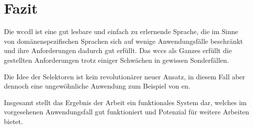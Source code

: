 \section{Fazit}
    Die \gls{wccdl} ist eine gut lesbare und einfach zu erlernende Sprache,
    die im Sinne von domänenspezifischen Sprachen
    sich auf wenige Anwendungsfälle beschränkt
    und ihre Anforderungen dadurch gut erfüllt.
    Das \gls{wccs} als Ganzes erfüllt die gestellten Anforderungen
    trotz einiger Schwächen in gewissen Sonderfällen.

    Die Idee der Selektoren ist kein revolutionärer neuer Ansatz,
    in diesem Fall aber dennoch eine ungewöhnliche Anwendung
    zum Beispiel von {\cssSelector}en.

    Insgesamt stellt das Ergebnis der Arbeit ein funktionales System dar,
    welches im vorgesehenen Anwendungsfall gut funktioniert
    und Potenzial für weitere Arbeiten bietet.